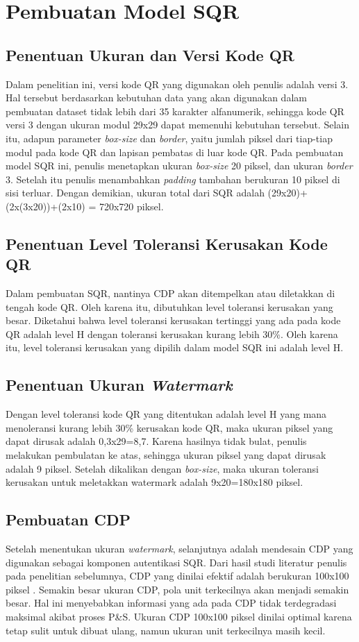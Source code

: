 \clearpage

\section{Pembuatan Model SQR}
\subsection{Penentuan Ukuran dan Versi Kode QR}
Dalam penelitian ini, versi kode QR yang digunakan oleh penulis adalah versi 3. Hal tersebut berdasarkan kebutuhan data yang akan digunakan dalam pembuatan
dataset tidak lebih dari 35 karakter alfanumerik, sehingga kode QR versi 3 dengan ukuran modul 29x29 dapat memenuhi kebutuhan tersebut. Selain itu, adapun
parameter \emph{box-size} dan \emph{border}, yaitu jumlah piksel dari tiap-tiap modul pada kode QR dan lapisan pembatas di luar kode QR. Pada pembuatan model
SQR ini, penulis menetapkan ukuran \emph{box-size} 20 piksel, dan ukuran \emph{border} 3. Setelah itu penulis menambahkan \emph{padding} tambahan berukuran 10
piksel di sisi terluar. Dengan demikian, ukuran total dari SQR adalah (29x20)+(2x(3x20))+(2x10) = 720x720 piksel.

\subsection{Penentuan Level Toleransi Kerusakan Kode QR}
Dalam pembuatan SQR, nantinya CDP akan ditempelkan atau diletakkan di tengah kode QR. Oleh karena itu, dibutuhkan level toleransi kerusakan yang besar.
Diketahui bahwa level toleransi kerusakan tertinggi yang ada pada kode QR adalah level H dengan toleransi kerusakan kurang lebih 30\%. Oleh karena itu, level
toleransi kerusakan yang dipilih dalam model SQR ini adalah level H.

\subsection{Penentuan Ukuran \emph{Watermark}}
Dengan level toleransi kode QR yang ditentukan adalah level H yang mana menoleransi kurang lebih 30\% kerusakan kode QR, maka ukuran piksel yang dapat dirusak adalah 0,3x29=8,7. Karena hasilnya tidak bulat, penulis melakukan pembulatan ke atas, sehingga ukuran piksel yang dapat dirusak adalah 9 piksel. Setelah dikalikan dengan \emph{box-size}, maka ukuran toleransi kerusakan untuk meletakkan watermark adalah 9x20=180x180 piksel.

\subsection{Pembuatan CDP}
Setelah menentukan ukuran \emph{watermark}, selanjutnya adalah mendesain CDP yang digunakan sebagai komponen autentikasi SQR. Dari hasil studi literatur
penulis pada penelitian sebelumnya, CDP yang dinilai efektif adalah berukuran 100x100 piksel \cite{PICARDCANCOPYDETECTIONPATTERN}. Semakin besar ukuran CDP,
pola unit terkecilnya akan menjadi semakin besar. Hal ini menyebabkan informasi yang ada pada CDP tidak terdegradasi maksimal akibat proses P\&S. Ukuran CDP
100x100 piksel dinilai optimal karena tetap sulit untuk dibuat ulang, namun ukuran unit terkecilnya masih kecil.

